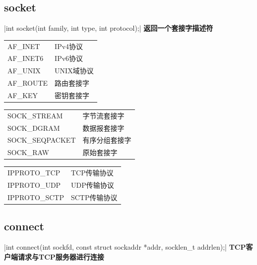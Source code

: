 \subsection{socket}
|int socket(int family, int type, int protocol);|
\noindent \textbf{返回一个套接字描述符}
\vskip 12pt
\noindent{\large\color[rgb]{0.2,0.4,0.6}{family:}}
\begin{table}[!htb]
\centering
	\begin{tabular}{l|l}
	AF\_INET & IPv4协议 \\
	AF\_INET6 & IPv6协议 \\
	AF\_UNIX & UNIX域协议 \\
	AF\_ROUTE & 路由套接字 \\
	AF\_KEY & 密钥套接字
	\end{tabular}
\end{table}

\noindent{\large\color[rgb]{0.2,0.4,0.6}{type:}}
\begin{table}[!htb]
\centering
	\begin{tabular}{l|l}
	SOCK\_STREAM & 字节流套接字 \\
	SOCK\_DGRAM & 数据报套接字 \\
	SOCK\_SEQPACKET & 有序分组套接字 \\
	SOCK\_RAW & 原始套接字
	\end{tabular}
\end{table}

\noindent{\large\color[rgb]{0.2,0.4,0.6}{protocal:}}
\begin{table}[!htb]
\centering
	\begin{tabular}{l|l}
	IPPROTO\_TCP & TCP传输协议 \\
	IPPROTO\_UDP & UDP传输协议 \\
	IPPROTO\_SCTP & SCTP传输协议
	\end{tabular}
\end{table}
\newpage

\subsection{connect}
|int connect(int sockfd, const struct sockaddr *addr, socklen_t addrlen);|
\noindent \textbf {TCP客户端请求与TCP服务器进行连接}

